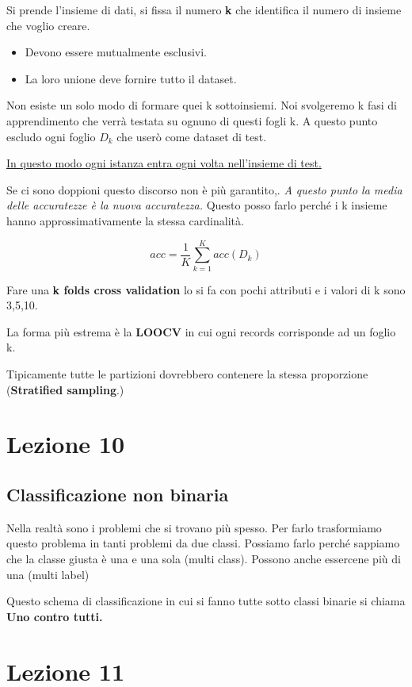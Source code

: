 \documentclass[12pt, a4paper,titlepage,openany]{article}
\begin{document}
Si prende l'insieme di dati, si fissa il numero \textbf{k} che identifica il numero di insieme che voglio creare.

\begin{itemize}
	\item Devono essere mutualmente esclusivi.
	\item La loro unione deve fornire tutto il dataset.
\end{itemize}

Non esiste un solo modo di formare quei k sottoinsiemi. Noi svolgeremo k fasi di apprendimento che verrà testata su ognuno di questi fogli k. A questo punto escludo ogni foglio $D_{k}$ che userò come dataset di test.

\underline{In questo modo ogni istanza entra ogni volta nell'insieme di test.}

Se ci sono doppioni questo discorso non è più garantito,.
\textit{A questo punto la media delle accuratezze è la nuova accuratezza.} Questo posso farlo perché i k insieme hanno approssimativamente la stessa cardinalità.

\[ acc = \frac{1}{K}\sum_{k = 1}^{K} acc(D_{k})\]

Fare una \textbf{k folds cross validation} lo si fa con pochi attributi e i valori di k sono 3,5,10.

La forma più estrema è la \textbf{LOOCV} in cui ogni records corrisponde ad un foglio k.

Tipicamente tutte le partizioni dovrebbero contenere la stessa proporzione (\textbf{Stratified sampling}.)


\section{Lezione 10}
\subsection{Classificazione non binaria}

Nella realtà sono i problemi che si trovano più spesso. Per farlo trasformiamo questo problema in tanti problemi da due classi. Possiamo farlo perché sappiamo che la classe giusta è una e una sola (multi class). Possono anche essercene più di una (multi label)

Questo schema di classificazione in cui si fanno tutte sotto classi binarie si chiama \textbf{Uno contro tutti.}

\section{Lezione 11}
\end{document}
